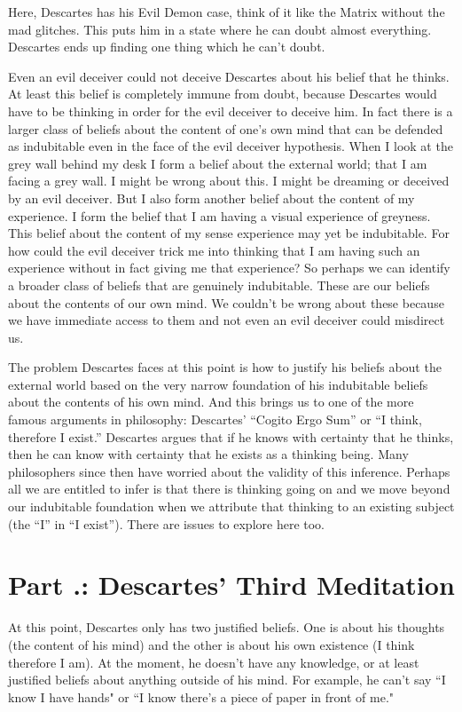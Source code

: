 Here, Descartes has his Evil Demon case, think of it like the Matrix without the mad glitches. This puts him in a state where he can doubt almost everything. Descartes ends up finding one thing which he can't doubt.

Even an evil deceiver could not deceive Descartes about his belief that he thinks. At least this belief is completely immune from doubt, because Descartes would have to be thinking in order for the evil deceiver to deceive him. In fact there is a larger class of beliefs about the content of one’s own mind that can be defended as indubitable even in the face of the evil deceiver hypothesis. When I look at the grey wall behind my desk I form a belief about the external world; that I am facing a grey wall. I might be wrong about this. I might be dreaming or deceived by an evil deceiver. But I also form another belief about the content of my experience. I form the belief that I am having a visual experience of greyness. This belief about the content of my sense experience may yet be indubitable. For how could the evil deceiver trick me into thinking that I am having such an experience without in fact giving me that experience? So perhaps we can identify a broader class of beliefs that are genuinely indubitable. These are our beliefs about the contents of our own mind. We couldn’t be wrong about these because we have immediate access to them and not even an evil deceiver could misdirect us.

The problem Descartes faces at this point is how to justify his beliefs about the external world based on the very narrow foundation of his indubitable beliefs about the contents of his own mind. And this brings us to one of the more famous arguments in philosophy: Descartes’ “Cogito Ergo Sum” or “I think, therefore I exist.” Descartes argues that if he knows with certainty that he thinks, then he can know with certainty that he exists as a thinking being. Many philosophers since then have worried about the validity of this inference. Perhaps all we are entitled to infer is that there is thinking going on and we move beyond our indubitable foundation when we attribute that thinking to an existing subject (the “I” in “I exist”). There are issues to explore here too. 

\section{Part \thechapcount.\theseccount: Descartes' Third Meditation}
At this point, Descartes only has two justified beliefs. One is about his thoughts (the content of his mind) and the other is about his own existence (I think therefore I am). At the moment, he doesn't have any knowledge, or at least justified beliefs about anything outside of his mind. For example, he can't say ``I know I have hands" or ``I know there's a piece of paper in front of me."

